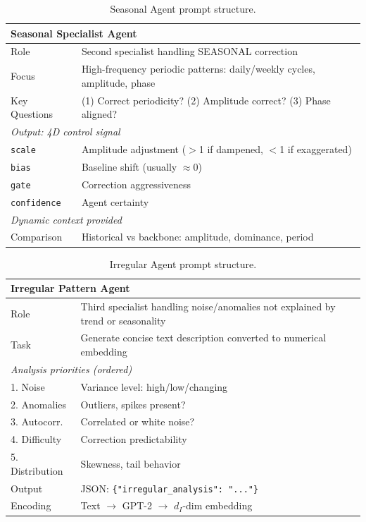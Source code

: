 \begin{table}[h!]
\centering
\scriptsize
\setlength{\tabcolsep}{3pt}
\begin{tabular}{p{1.8cm}p{5.2cm}}
\toprule
\multicolumn{2}{l}{\textbf{Seasonal Specialist Agent}} \\
\midrule
Role & Second specialist handling SEASONAL correction \\
Focus & High-frequency periodic patterns: daily/weekly cycles, amplitude, phase \\
Key Questions & (1) Correct periodicity? (2) Amplitude correct? (3) Phase aligned? \\
\midrule
\multicolumn{2}{l}{\textit{Output: 4D control signal}} \\
\texttt{scale} & Amplitude adjustment ($>$1 if dampened, $<$1 if exaggerated) \\
\texttt{bias} & Baseline shift (usually $\approx 0$) \\
\texttt{gate} & Correction aggressiveness \\
\texttt{confidence} & Agent certainty \\
\midrule
\multicolumn{2}{l}{\textit{Dynamic context provided}} \\
Comparison & Historical vs backbone: amplitude, dominance, period \\
\bottomrule
\end{tabular}
\caption{Seasonal Agent prompt structure.}
\label{tab:prompt_seasonal}
\end{table}

\begin{table}[h!]
\centering
\scriptsize
\setlength{\tabcolsep}{3pt}
\begin{tabular}{p{1.8cm}p{5.2cm}}
\toprule
\multicolumn{2}{l}{\textbf{Irregular Pattern Agent}} \\
\midrule
Role & Third specialist handling noise/anomalies not explained by trend or seasonality \\
Task & Generate concise text description converted to numerical embedding \\
\midrule
\multicolumn{2}{l}{\textit{Analysis priorities (ordered)}} \\
1. Noise & Variance level: high/low/changing \\
2. Anomalies & Outliers, spikes present? \\
3. Autocorr. & Correlated or white noise? \\
4. Difficulty & Correction predictability \\
5. Distribution & Skewness, tail behavior \\
\midrule
Output & JSON: \texttt{\{"irregular\_analysis": "..."\}} \\
Encoding & Text $\rightarrow$ GPT-2 $\rightarrow$ $d_I$-dim embedding \\
\bottomrule
\end{tabular}
\caption{Irregular Agent prompt structure.}
\label{tab:prompt_irregular}
\end{table}

